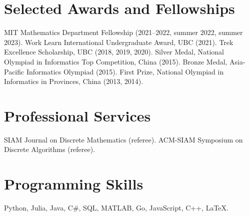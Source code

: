 \documentclass[letterpaper,11pt]{article}
\makeatletter
\newcommand{\resumeItem}[2]{
  \item\small{
    \textbf{#1}{: #2 \vspace{-2pt}}
  }
}
\newcommand{\awardSubItem}[2]{
  \item
    \begin{tabular*}{0.97\textwidth}{l@{\extracolsep{\fill}}r}
      \textbf{\small #1} & \textit{\small #2} \\
    \end{tabular*}\vspace{-8pt}
}
\newcommand{\resumeSubItem}[2]{\resumeItem{#1}{#2}\vspace{-4pt}}
\newcommand{\resumeSubHeadingListStart}{\begin{itemize}[leftmargin=*]}
\newcommand{\resumeSubHeadingListEnd}{\end{itemize}}
\makeatother
\begin{document}
\section{Selected Awards and Fellowships}
MIT Mathematics Department Fellowship (2021--2022, summer 2022, summer 2023). Work Learn International Undergraduate Award, UBC (2021). Trek Excellence Scholarship, UBC (2018, 2019, 2020). Silver Medal, National Olympiad in Informatics Top Competition, China (2015). Bronze Medal, Asia-Pacific Informatics Olympiad (2015). First Prize, National Olympiad in Informatics in Provinces, China (2013, 2014).

\section{Professional Services}
SIAM Journal on Discrete Mathematics (referee). ACM-SIAM Symposium on Discrete Algorithms (referee).

\section{Programming Skills}
Python, Julia, Java, C\#, SQL, MATLAB, Go, JavaScript, C++, \LaTeX.


\end{document}

